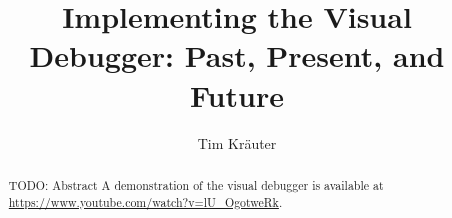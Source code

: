 \documentclass[sigconf]{acmart}
\begin{document}
\title{Implementing the Visual Debugger: Past, Present, and Future}

\author{Tim Kr\"{a}uter}





\renewcommand{\shortauthors}{Kräuter et al.}
\newcommand{\intellij}{IntelliJ IDEA } %

\begin{abstract}
  TODO: Abstract
A demonstration of the visual debugger is available at \url{https://www.youtube.com/watch?v=lU_OgotweRk}.
\end{abstract}


\end{document}
